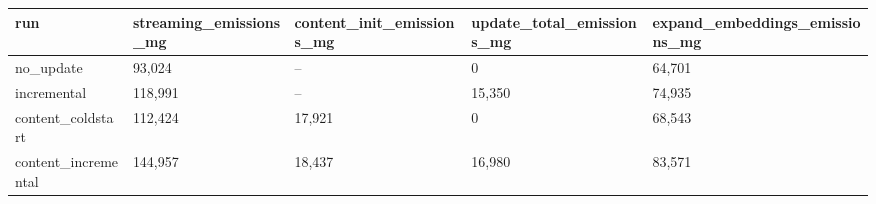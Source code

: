 \begin{tabular}{lllll}
\toprule
run & streaming_emissions_mg & content_init_emissions_mg & update_total_emissions_mg & expand_embeddings_emissions_mg \\
\midrule
no_update & 93,024 & -- & 0 & 64,701 \\
incremental & 118,991 & -- & 15,350 & 74,935 \\
content_coldstart & 112,424 & 17,921 & 0 & 68,543 \\
content_incremental & 144,957 & 18,437 & 16,980 & 83,571 \\
\bottomrule
\end{tabular}
